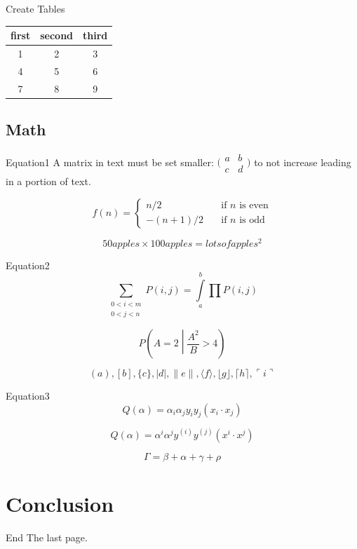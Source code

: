 \begin{frame}{Create Tables}
    \begin{center}
        \begin{table}[!t]  
            \begin{tabular}{ccc}  
                \toprule   
                first&second&third\\ 
                \midrule       
                1 & 2 & 3 \\ 
                4 & 5 & 6 \\ 
                7 & 8 & 9 \\
                \bottomrule  
            \end{tabular}
        \end{table}
    \end{center}
\end{frame}

\subsection{Math}

\begin{frame}{Equation1}
    A matrix in text must be set  smaller:
    $\bigl(\begin{smallmatrix}
    a&b \\ c&d
    \end{smallmatrix} \bigr)$
    to not increase leading in a portion of text.

    \[ f(n) =
    \begin{cases}
        n/2       & \quad \text{if } n \text{ is even}\\
        -(n+1)/2  & \quad \text{if } n \text{ is odd}
    \end{cases}
    \]

    $$50 apples \times 100 apples = lots of apples^2$$
\end{frame}

\begin{frame}{Equation2}
    $$\sum_{\substack{0<i<m \\ 0<j<n }} 
      P(i,j)=\int\limits_a^b\prod P(i,j)$$

    $$P\left(A=2\middle|\frac{A^2}{B}>4\right)$$

    $$( a ), [ b ], \{ c \}, | d |, \| e \|,
    \langle f \rangle, \lfloor g \rfloor,
    \lceil h \rceil, \ulcorner i \urcorner$$
\end{frame}

\begin{frame}{Equation3}
    $$Q(\alpha)=\alpha_i\alpha_jy_iy_j(x_i\cdot x_j)$$

    $$Q(\alpha)=\alpha^i\alpha^jy^{(i)}y^{(j)}(x^i\cdot x^j)$$
    
    $$\Gamma=\beta+\alpha+\gamma+\rho$$
\end{frame}



\section{Conclusion}

\begin{frame}{End}
    The last page.
\end{frame}